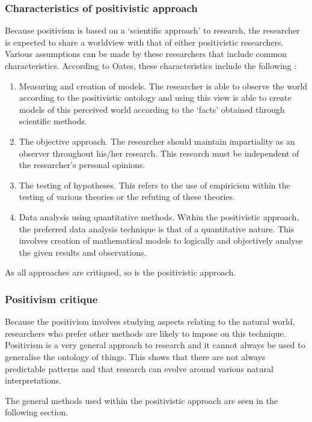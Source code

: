 \subsubsection{Characteristics of positivistic approach}
Because positivism is based on a ‘scientific approach’ to research, the researcher is expected to share a worldview with that of either positivistic researchers. Various assumptions can be made by these researchers that include common characteristics. According to Oates, these characteristics include the following \citep{OatesJ2006}: 
\begin{enumerate}[label=\roman*.]
	\item Measuring and creation of models. The researcher is able to observe the world according to the positivistic ontology and using this view is able to create models of this perceived world according to the ‘facts’ obtained through scientific methods.
	\item The objective approach. The researcher should maintain impartiality as an observer throughout his/her research. This research must be independent of the researcher’s personal opinions.
	\item The testing of hypotheses. This refers to the use of empiricism within the testing of various theories or the refuting of these theories.
	\item Data analysis using quantitative methods. Within the positivistic approach, the preferred data analysis technique is that of a quantitative nature. This involves creation of mathematical models to logically and objectively analyse the given results and observations.
\end{enumerate}

As all approaches are critiqued, so is the positivistic approach. 

\subsubsection{Positivism critique}
Because the positivism involves studying aspects relating to the natural world, researchers who prefer other methods are likely to impose on this technique. Positivism is a very general approach to research and it cannot always be used to generalise the ontology of things. This shows that there are not always predictable patterns and that research can evolve around various natural interpretations.

The general methods used within the positivistic approach are seen in the following section.

